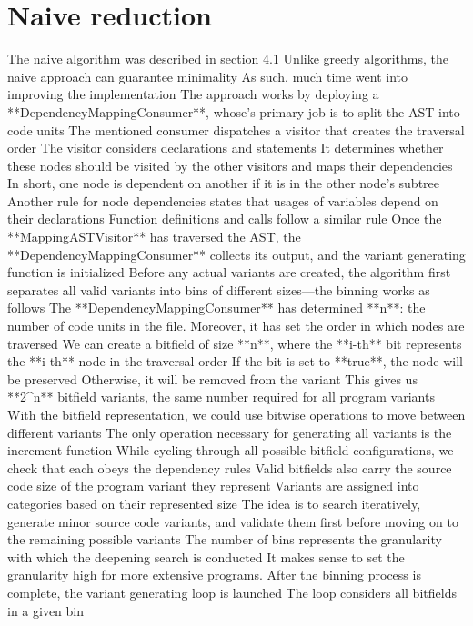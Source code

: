 {\section{Naive reduction}

The naive algorithm was described in section 4.1
Unlike greedy algorithms, the naive approach can guarantee minimality
As such, much time went into improving the implementation
The approach works by deploying a **DependencyMappingConsumer**, whose's primary job is to split the AST into code units
The mentioned consumer dispatches a visitor that creates the traversal order
The visitor considers declarations and statements
It determines whether these nodes should be visited by the other visitors and maps their dependencies
In short, one node is dependent on another if it is in the other node's subtree
Another rule for node dependencies states that usages of variables depend on their declarations
Function definitions and calls follow a similar rule
Once the **MappingASTVisitor** has traversed the AST, the **DependencyMappingConsumer** collects its output, and the variant generating function is initialized
Before any actual variants are created, the algorithm first separates all valid variants into bins of different sizes—the binning works as follows
The **DependencyMappingConsumer** has determined **n**: the number of code units in the file.
Moreover, it has set the order in which nodes are traversed
We can create a bitfield of size **n**, where the **i-th** bit represents the **i-th** node in the traversal order
If the bit is set to **true**, the node will be preserved
Otherwise, it will be removed from the variant
This gives us **2^n** bitfield variants, the same number required for all program variants
With the bitfield representation, we could use bitwise operations to move between different variants
The only operation necessary for generating all variants is the increment function
While cycling through all possible bitfield configurations, we check that each obeys the dependency rules
Valid bitfields also carry the source code size of the program variant they represent
Variants are assigned into categories based on their represented size
The idea is to search iteratively, generate minor source code variants, and validate them first before moving on to the remaining possible variants
The number of bins represents the granularity with which the deepening search is conducted
It makes sense to set the granularity high for more extensive programs.
After the binning process is complete, the variant generating loop is launched
The loop considers all bitfields in a given bin
}
